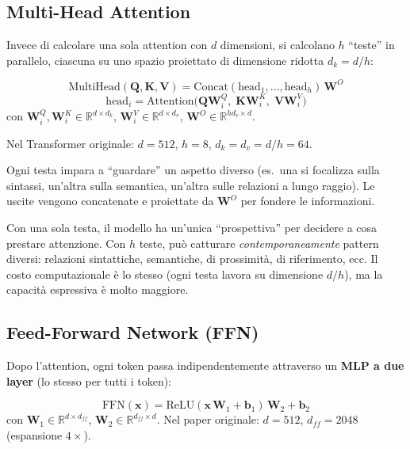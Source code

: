 \documentclass[
  11pt,
]{article}
\begin{document}
\subsection{Multi-Head Attention}

Invece di calcolare una sola attention con $d$ dimensioni, si calcolano $h$ ``teste'' in parallelo, ciascuna su uno spazio proiettato di dimensione ridotta $d_k = d/h$:

\begin{formulabox}[title={\textbf{Multi-Head Attention}}]
\[
\text{MultiHead}(\mathbf{Q}, \mathbf{K}, \mathbf{V}) = \text{Concat}(\text{head}_1, \ldots, \text{head}_h)\,\mathbf{W}^O
\]
\[
\text{head}_i = \text{Attention}\!\bigl(\mathbf{Q}\mathbf{W}_i^Q,\;\mathbf{K}\mathbf{W}_i^K,\;\mathbf{V}\mathbf{W}_i^V\bigr)
\]
con $\mathbf{W}_i^Q, \mathbf{W}_i^K \in \mathbb{R}^{d \times d_k}$, $\mathbf{W}_i^V \in \mathbb{R}^{d \times d_v}$, $\mathbf{W}^O \in \mathbb{R}^{hd_v \times d}$.

Nel Transformer originale: $d = 512$, $h = 8$, $d_k = d_v = d/h = 64$.
\end{formulabox}

Ogni testa impara a ``guardare'' un aspetto diverso (es.\ una si focalizza sulla sintassi, un'altra sulla semantica, un'altra sulle relazioni a lungo raggio). Le uscite vengono concatenate e proiettate da $\mathbf{W}^O$ per fondere le informazioni.

\begin{notabox}[title={\textbf{Perché multi-head e non single-head?}}]
Con una sola testa, il modello ha un'unica ``prospettiva'' per decidere a cosa prestare attenzione. Con $h$ teste, può catturare \emph{contemporaneamente} pattern diversi: relazioni sintattiche, semantiche, di prossimità, di riferimento, ecc. Il costo computazionale è lo stesso (ogni testa lavora su dimensione $d/h$), ma la capacità espressiva è molto maggiore.
\end{notabox}

\subsection{Feed-Forward Network (FFN)}

Dopo l'attention, ogni token passa indipendentemente attraverso un \textbf{MLP a due layer} (lo stesso per tutti i token):

\begin{formulabox}[title={\textbf{Feed-Forward Network}}]
\[
\text{FFN}(\mathbf{x}) = \text{ReLU}(\mathbf{x}\,\mathbf{W}_1 + \mathbf{b}_1)\,\mathbf{W}_2 + \mathbf{b}_2
\]
con $\mathbf{W}_1 \in \mathbb{R}^{d \times d_{ff}}$, $\mathbf{W}_2 \in \mathbb{R}^{d_{ff} \times d}$. Nel paper originale: $d = 512$, $d_{ff} = 2048$ (espansione $4\times$).
\end{formulabox}
\end{document}
